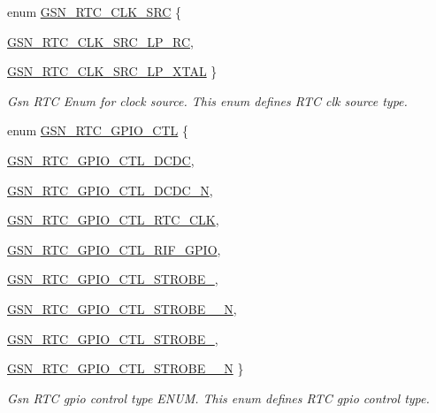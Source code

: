 \begin{DoxyCompactItemize}
\item 
enum \hyperlink{a00651_gaace509e7754aacb14b76f77e68fa9b2a}{GSN\_\-RTC\_\-CLK\_\-SRC} \{ \par
\hyperlink{a00651_ggaace509e7754aacb14b76f77e68fa9b2aa103f27c2edcc660a4bd726cfa53df43b}{GSN\_\-RTC\_\-CLK\_\-SRC\_\-LP\_\-RC}, 
\par
\hyperlink{a00651_ggaace509e7754aacb14b76f77e68fa9b2aac0cf76a0773079a58adbc64828e8aa6f}{GSN\_\-RTC\_\-CLK\_\-SRC\_\-LP\_\-XTAL}
 \}
\begin{DoxyCompactList}\small\item\em Gsn RTC Enum for clock source. This enum defines RTC clk source type. \end{DoxyCompactList}\item 
enum \hyperlink{a00651_ga3481de456997229518bb1895981bfd74}{GSN\_\-RTC\_\-GPIO\_\-CTL} \{ \par
\hyperlink{a00651_gga3481de456997229518bb1895981bfd74a087e1ac97a549039bf46b0ca6f7da567}{GSN\_\-RTC\_\-GPIO\_\-CTL\_\-DCDC}, 
\par
\hyperlink{a00651_gga3481de456997229518bb1895981bfd74af5391710c39c3af1ce9ee70bc1a5d9ad}{GSN\_\-RTC\_\-GPIO\_\-CTL\_\-DCDC\_\-N}, 
\par
\hyperlink{a00651_gga3481de456997229518bb1895981bfd74a376a5f6b9f22deac5b1d1b6b19abbe8c}{GSN\_\-RTC\_\-GPIO\_\-CTL\_\-RTC\_\-CLK}, 
\par
\hyperlink{a00651_gga3481de456997229518bb1895981bfd74a8095290c629ab3e4edaaa422706fe324}{GSN\_\-RTC\_\-GPIO\_\-CTL\_\-RIF\_\-GPIO}, 
\par
\hyperlink{a00651_gga3481de456997229518bb1895981bfd74a344e9ded945d7d2b627a17c04a980c62}{GSN\_\-RTC\_\-GPIO\_\-CTL\_\-STROBE\_}, 
\par
\hyperlink{a00651_gga3481de456997229518bb1895981bfd74acc022991bbbfc2142c05b2ad8183fe16}{GSN\_\-RTC\_\-GPIO\_\-CTL\_\-STROBE\_\_\-N}, 
\par
\hyperlink{a00651_gga3481de456997229518bb1895981bfd74a6b4bbf344813dfbfd8632a50aa7101c3}{GSN\_\-RTC\_\-GPIO\_\-CTL\_\-STROBE\_}, 
\par
\hyperlink{a00651_gga3481de456997229518bb1895981bfd74a56a87191f515554c1285609343679e85}{GSN\_\-RTC\_\-GPIO\_\-CTL\_\-STROBE\_\_\-N}
 \}
\begin{DoxyCompactList}\small\item\em Gsn RTC gpio control type ENUM. This enum defines RTC gpio control type. \end{DoxyCompactList}\item 

\end{DoxyCompactItemize}
